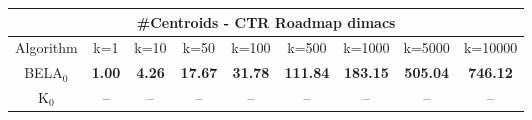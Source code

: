\begin{tabular}{c|cccccccc}\toprule
\multicolumn{9}{c}{#Centroids - CTR Roadmap dimacs}\\ \midrule
Algorithm & k=1 & k=10 & k=50 & k=100 & k=500 & k=1000 & k=5000 & k=10000 \\ \midrule
BELA$_0$ & \textbf{1.00} & \textbf{4.26} & \textbf{17.67} & \textbf{31.78} & \textbf{111.84} & \textbf{183.15} & \textbf{505.04} & \textbf{746.12} \\
K$_0$ & -- & -- & -- & -- & -- & -- & -- & -- \\ \bottomrule 
\end{tabular}
